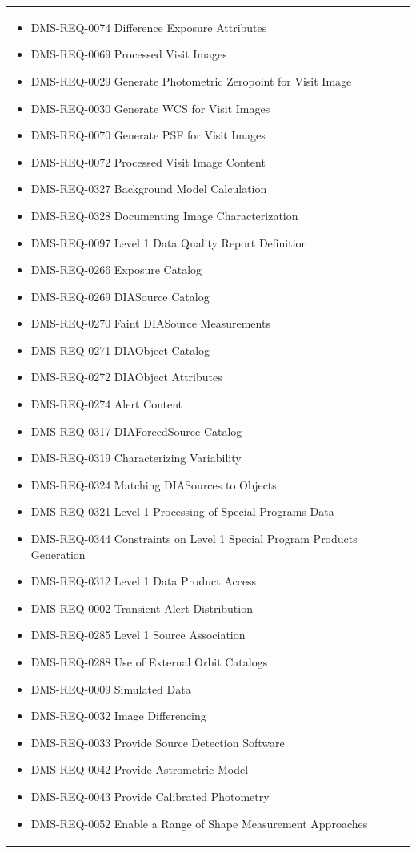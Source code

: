 \documentclass[DM,lsstdraft,toc]{lsstdoc}
\begin{document}
\begin{xtabular}{|p{0.1\textwidth}|p{0.85\textwidth}|}
\begin{itemize}
\item DMS-REQ-0074 Difference Exposure Attributes
\item DMS-REQ-0069 Processed Visit Images
\item DMS-REQ-0029 Generate Photometric Zeropoint for Visit Image
\item DMS-REQ-0030 Generate WCS for Visit Images
\item DMS-REQ-0070 Generate PSF for Visit Images
\item DMS-REQ-0072 Processed Visit Image Content
\item DMS-REQ-0327 Background Model Calculation
\item DMS-REQ-0328 Documenting Image Characterization
\item DMS-REQ-0097 Level 1 Data Quality Report Definition
\item DMS-REQ-0266 Exposure Catalog
\item DMS-REQ-0269 DIASource Catalog
\item DMS-REQ-0270 Faint DIASource Measurements
\item DMS-REQ-0271 DIAObject Catalog
\item DMS-REQ-0272 DIAObject Attributes
\item DMS-REQ-0274 Alert Content
\item DMS-REQ-0317 DIAForcedSource Catalog
\item DMS-REQ-0319 Characterizing Variability
\item DMS-REQ-0324 Matching DIASources to Objects
\item DMS-REQ-0321 Level 1 Processing of Special Programs Data
\item DMS-REQ-0344 Constraints on Level 1 Special Program Products Generation
\item DMS-REQ-0312 Level 1 Data Product Access
\item DMS-REQ-0002 Transient Alert Distribution
\item DMS-REQ-0285 Level 1 Source Association
\item DMS-REQ-0288 Use of External Orbit Catalogs
\item DMS-REQ-0009 Simulated Data
\item DMS-REQ-0032 Image Differencing
\item DMS-REQ-0033 Provide Source Detection Software
\item DMS-REQ-0042 Provide Astrometric Model
\item DMS-REQ-0043 Provide Calibrated Photometry
\item DMS-REQ-0052 Enable a Range of Shape Measurement Approaches

\end{itemize}
\end{xtabular}
\end{document}
